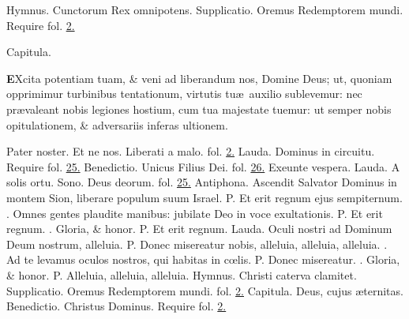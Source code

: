 \documentclass[letter,11pt]{book}
\makeatletter
\DeclareRobustCommand{\Vbar}{\vers@resp{-0.1em}{V}}
\newcommand{\vers@resp@sym}{\raisebox{0.2ex}{\rotatebox[origin=c]{-20}{$\m@th\rceil$}}}
\newcommand{\vers@resp}[2]{%
  {\ooalign{\hidewidth\kern#1\vers@resp@sym\hidewidth\cr#2\cr}}%
}%
\def\P{\color{Red} P. \color{black}}
\def\V{\color{Red} \Vbar . \color{black}}
\makeatother
\begin{document}
\begin{multicols}{2}
\newline \color{Red} Hymnus. \color{black} Cunctorum Rex omnipotens. \color{Red} Supplicatio. \color{black} Oremus Redemptorem mundi. \color{Red} Require fol. \color{black} \hyperlink{page.2}{2.}
\vspace{-.5em} \begin{center} \color{Red} Capitula. \color{black} \end{center} \vspace{-.5em}
\lettrine[lines=2]{\bfseries \color{Red} E}{}Xcita potentiam tuam, \& veni ad liberandum nos, Domine Deus; ut, quoniam opprimimur turbinibus tentationum, virtutis tu\ae \ auxilio sublevemur: nec pr\ae valeant nobis legiones hostium, cum tua majestate tuemur: ut semper nobis opitulationem, \& adversariis inferas ultionem.
\par Pater noster. Et ne nos. Liberati a malo. \color{Red} fol. \color{black} \hyperlink{page.2}{2.}
\newline \color{Red} Lauda. \color{black} Dominus in circuitu. \color{Red} Require fol. \color{black} \hyperlink{page.25}{25.} \color{Red} Benedictio. \color{black} Unicus Filius Dei. \color{Red} fol. \color{black} \hyperlink{page.26}{26.} \color{Red} \hypertarget{DOM-QUARTO-ADV-VES-II}{Exeunte vespera.} Lauda. \color{black} A solis ortu. \color{Red} Sono. \color{black} Deus deorum. \color{Red} fol. \color{black} \hyperlink{DOM-QUARTO-ADV-VES}{25.}
\newline \color{Red} Antiphona. \color{black} Ascendit Salvator Dominus in montem Sion, liberare populum suum Israel. \P Et erit regnum ejus sempiternum. \V Omnes gentes plaudite manibus: jubilate Deo in voce exultationis. \P Et erit regnum. \V Gloria, \& honor. \P Et erit regnum.
\newline \color{Red} Lauda. \color{black} Oculi nostri ad Dominum Deum nostrum, alleluia. \P Donec misereatur nobis, alleluia, alleluia, alleluia. \V Ad te levamus oculos nostros, qui habitas in c\oe lis. \P Donec misereatur. \V Gloria, \& honor. \P Alleluia, alleluia, alleluia.
\newline \color{Red} Hymnus. \color{black} Christi caterva clamitet. \color{Red} Supplicatio. \color{black} Oremus Redemptorem mundi. \color{Red} fol. \color{black} \hyperlink{hymn.Christi}{2.}
\newline \color{Red} Capitula. \color{black} Deus, cujus \ae ternitas. \color{Red} Benedictio. \color{black} Christus Dominus. \color{Red} Require fol. \color{black} \hyperlink{page.2}{2.}

\end{multicols}
\end{document}
